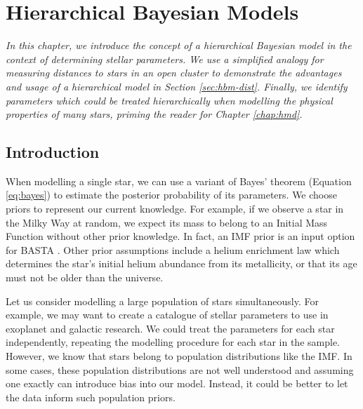 %
%
%
%
%
\chapter{Hierarchical Bayesian Models}\label{chap:hbm}

\textit{In this chapter, we introduce the concept of a hierarchical Bayesian model in the context of determining stellar parameters. We use a simplified analogy for measuring distances to stars in an open cluster to demonstrate the advantages and usage of a hierarchical model in Section \ref{sec:hbm-dist}. Finally, we identify parameters which could be treated hierarchically when modelling the physical properties of many stars, priming the reader for Chapter \ref{chap:hmd}.}

\section{Introduction}

When modelling a single star, we can use a variant of Bayes' theorem (Equation \ref{eq:bayes}) to estimate the posterior probability of its parameters. We choose priors to represent our current knowledge. For example, if we observe a star in the Milky Way at random, we expect its mass to belong to an Initial Mass Function \citep[IMF; e.g.][]{Chabrier2003} without other prior knowledge. In fact, an IMF prior is an input option for BASTA \citep{AguirreBorsen-Koch.Rorsted.ea2022}. Other prior assumptions include a helium enrichment law which determines the star's initial helium abundance from its metallicity, or that its age must not be older than the universe.

Let us consider modelling a large population of stars simultaneously. For example, we may want to create a catalogue of stellar parameters to use in exoplanet and galactic research. We could treat the parameters for each star independently, repeating the modelling procedure for each star in the sample. However, we know that stars belong to population distributions like the IMF. In some cases, these population distributions are not well understood and assuming one exactly can introduce bias into our model. Instead, it could be better to let the data inform such population priors.

